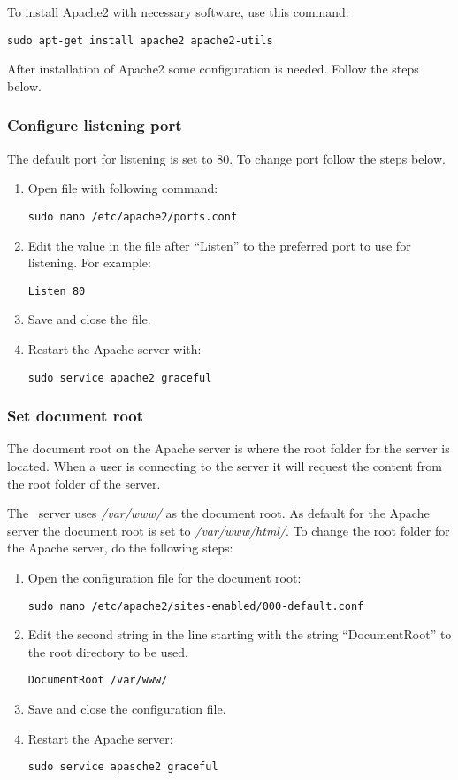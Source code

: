 To install Apache2 with necessary software, use this command:
\begin{verbatim}
sudo apt-get install apache2 apache2-utils
\end{verbatim}
After installation of Apache2 some configuration is needed. Follow the steps below.
\subsubsection{Configure listening port}\label{ports}
The default port for listening is set to 80. To change port follow the steps below.
\begin{enumerate}
	\item Open file with following command: \begin{verbatim}sudo nano /etc/apache2/ports.conf\end{verbatim}
    \item Edit the value in the file after ``Listen'' to the preferred port to use for listening. 
    For example: \begin{verbatim}Listen 80\end{verbatim}
    \item Save and close the file.
    \item Restart the Apache server with: \begin{verbatim}sudo service apache2 graceful\end{verbatim}
\end{enumerate}

\subsubsection{Set document root}\label{sec:exp_docroot}
The document root on the Apache server is where the root folder for the server is located. When a user is connecting to the server it will request the content from the root folder of the server.

The \appName\ server uses \textit{/var/www/} as the document root. As default for the Apache server 
the document root is set to \textit{/var/www/html/}.
To change the root folder for the Apache server, do the following steps:
\begin{enumerate}
	\item Open the configuration file for the document root: \begin{verbatim}sudo nano /etc/apache2/sites-enabled/000-default.conf\end{verbatim}
    \item Edit the second string in the line starting with the string ``DocumentRoot'' to the root directory to be used.
    \begin{verbatim}DocumentRoot /var/www/\end{verbatim}
    \item Save and close the configuration file.
    \item Restart the Apache server: \begin{verbatim}sudo service apasche2 graceful\end{verbatim}
\end{enumerate}

